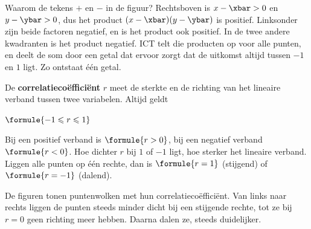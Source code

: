 Waarom de tekens $+$ en $-$ in de figuur? Rechtsboven is $x - \xbar > 0$ en $y - \ybar > 0$, dus het product $(x - \xbar)(y - \ybar)$ is positief. Linksonder zijn beide factoren negatief, en is het product ook positief. In de twee andere kwadranten is het product negatief. ICT telt die producten op voor alle punten, en deelt de som door een getal dat ervoor zorgt dat de uitkomst altijd tussen $-1$ en $1$ ligt. Zo ontstaat één getal.

\begin{theorie}
De \textbf{\textcolor{accent}{correlatiecoëfficiënt}} $r$ meet de sterkte en de richting van het lineaire verband tussen twee variabelen. Altijd geldt

\vspace{1mm}
\qquad $\formule{-1 \leqslant r \leqslant 1}$

\vspace{1mm}
Bij een positief verband is $\formule{r > 0}$, bij een negatief verband $\formule{r < 0}$. Hoe dichter $r$ bij $1$ of $-1$ ligt, hoe sterker het lineaire verband. Liggen alle punten op één rechte, dan is $\formule{r = 1}$ (stijgend) of $\formule{r = -1}$ (dalend).
\end{theorie}

De figuren tonen puntenwolken met hun correlatiecoëfficiënt. Van links naar rechts liggen de punten steeds minder dicht bij een stijgende rechte, tot ze bij $r = 0$ geen richting meer hebben. Daarna dalen ze, steeds duidelijker.

